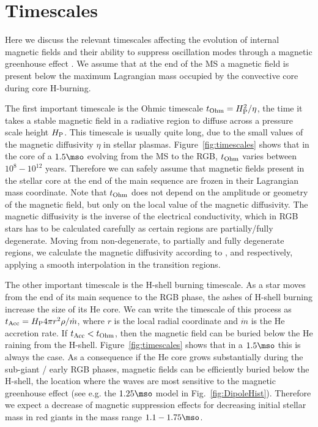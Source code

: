 \section{Timescales}
\label{time}

Here we discuss the relevant timescales affecting the evolution of internal magnetic fields and their ability to 
suppress oscillation modes through a magnetic greenhouse effect \citep{Fuller_2015}.
We assume that at the end of the MS a magnetic field is present below the maximum Lagrangian mass occupied by the convective core during core H-burning.

The first important timescale is the Ohmic timescale $t_{\rm Ohm}= H_{\rm P}^2/\eta$, the time it takes a stable magnetic field in a radiative region to diffuse across a pressure scale height $H_{\rm P}$. This timescale is usually quite long, due to the small values of the magnetic diffusivity $\eta$ in stellar plasmas. Figure~\ref{fig:timescales} shows that in the core of a $1.5\mso$ evolving from the MS to the RGB, $t_{\rm Ohm}$ varies between $10^8-10^{12}$ years. Therefore we can safely assume that magnetic fields present in the stellar core at the end of the main sequence are frozen in their Lagrangian mass coordinate.
Note that  $t_{\rm Ohm}$ does not depend on the amplitude or geometry of the magnetic field, but only on the local value of the magnetic diffusivity. The magnetic diffusivity is the inverse of the electrical conductivity,  which in RGB stars has to be calculated carefully as certain regions are partially/fully degenerate. Moving from non-degenerate, to partially and fully degenerate regions, we calculate the magnetic diffusivity according to \cite{1968dms..book.....S}, \cite{1987ApJ...313..284W} and \cite{1984MNRAS.209..511N} respectively, applying a smooth interpolation in the transition regions.

The other important timescale is the H-shell burning timescale. As a star moves from the end of its main sequence to the RGB phase, the ashes of H-shell burning increase the size of its He core. We can write the timescale of this process as $t_{\rm Acc} = H_{\rm P} 4\pi r^2 \rho / \dot{m}$, where $r$ is the local radial coordinate and $\dot{m}$ is the He accretion rate. If $t_{\rm Acc} < t_{\rm Ohm}$, then the magnetic field can be buried below the He raining from the H-shell. Figure~\ref{fig:timescales} shows that in a $1.5\mso$ this is always the case. As a consequence if the He core grows substantially during the sub-giant / early RGB phases, magnetic fields can be efficiently buried below the H-shell, the location where the waves are most sensitive to the magnetic greenhouse effect (see e.g. the $1.25\mso$ model in                  Fig.~\ref{fig:DipoleHist}). Therefore we expect a decrease of magnetic suppression effects for decreasing initial stellar mass in red giants in the mass range $1.1-1.75\mso$.

